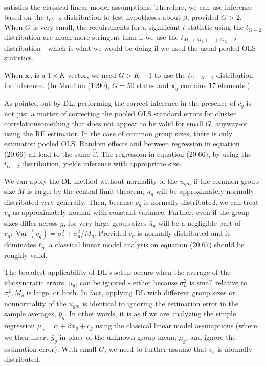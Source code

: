 \documentclass[10pt]{article}
\begin{document}
satisfies the classical linear model assumptions. Therefore, we can use inference based on the $t_{G-2}$ distribution to test hypotheses about $\beta$, provided $G>2$. When $G$ is very small, the requirements for a significant $t$ statistic using the $t_{G-2}$ distribution are much more stringent than if we use the $t_{M_{1}+M_{2}+\cdots+M_{G}-2}$ distribution - which is what we would be doing if we used the usual pooled OLS statistics.

When $\mathbf{x}_{g}$ is a $1 \times K$ vector, we need $G>K+1$ to use the $t_{G-K-1}$ distribution for inference. (In Moulton (1990), $G=50$ states and $\mathbf{x}_{g}$ contains 17 elements.)

As pointed out by DL, performing the correct inference in the presence of $c_{g}$ is not just a matter of correcting the pooled OLS standard errors for cluster correlationsomething that does not appear to be valid for small $G$, anyway-or using the RE estimator. In the case of common group sizes, there is only estimator: pooled OLS. Random effects and between regression in equation (20.66) all lead to the same $\hat{\beta}$. The regression in equation (20.66), by using the $t_{G-2}$ distribution, yields inference with appropriate size.

We can apply the DL method without normality of the $u_{g m}$ if the common group size $M$ is large: by the central limit theorem, $\bar{u}_{g}$ will be approximately normally distributed very generally. Then, because $c_{g}$ is normally distributed, we can treat $\bar{v}_{g}$ as approximately normal with constant variance. Further, even if the group sizes differ across $g$, for very large group sizes $\bar{u}_{g}$ will be a negligible part of $\bar{v}_{g}: \operatorname{Var}\left(\bar{v}_{g}\right)=\sigma_{c}^{2}+ \sigma_{u}^{2} / M_{g}$. Provided $c_{g}$ is normally distributed and it dominates $\bar{v}_{g}$, a classical linear model analysis on equation (20.67) should be roughly valid.

The broadest applicability of DL's setup occurs when the average of the idiosyncratic errors, $\bar{u}_{g}$, can be ignored - either because $\sigma_{u}^{2}$ is small relative to $\sigma_{c}^{2}, M_{g}$ is large, or both. In fact, applying DL with different group sizes or nonnormality of the $u_{g m}$ is identical to ignoring the estimation error in the sample averages, $\bar{y}_{g}$. In other words, it is as if we are analyzing the simple regression $\mu_{g}=\alpha+\beta x_{g}+c_{g}$ using the classical linear model assumptions (where we then insert $\bar{y}_{g}$ in place of the unknown group mean, $\mu_{g}$, and ignore the estimation error). With small $G$, we need to further assume that $c_{g}$ is normally distributed.
\end{document}
